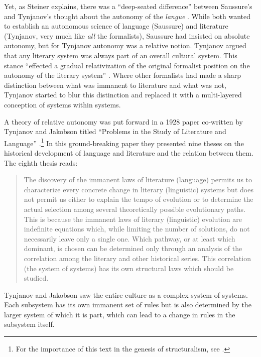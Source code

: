 \documentclass[output=paper]{langscibook}
\begin{document}
Yet, as Steiner explains, there was a ``deep-seated difference'' between Saussure's and Tynjanov's thought about the autonomy of the \emph{langue} \citep[112]{Steiner1984}. While both wanted to establish an autonomous science of language (Saussure) and literature (Tynjanov, very much like \emph{all} the formalists), Saussure had insisted on absolute autonomy, but for Tynjanov autonomy was a relative notion. Tynjanov argued that any literary system was always part of an overall cultural system. This stance ``effected a gradual relativization of the original formalist position on the autonomy of the literary system'' \citep[111]{Steiner1984}. Where other formalists had made a sharp distinction between what was immanent to literature and what was not, Tynjanov started to blur this distinction and replaced it with a multi-layered conception of systems within systems.

A theory of relative autonomy was put forward in a 1928 paper co-written by Tynjanov and Jakobson titled ``Problems in the Study of Literature and Language'' \citep{Tyjanov1928}.\footnote{For the importance of this text in the genesis of structuralism, see \citet[17]{Holenstein1975}.} In this ground-breaking paper they presented nine theses on the historical development of language and literature and the relation between them. The eighth thesis reads:

\begin{quotation}
The discovery of the immanent laws of literature (language) permits us to characterize every concrete change in literary (linguistic) systems but does not permit us either to explain the tempo of evolution or to determine the actual selection among several theoretically possible evolutionary paths. This is because the immanent laws of literary (linguistic) evolution are indefinite equations which, while limiting the number of solutions, do not necessarily leave only a single one. Which pathway, or at least which dominant, is chosen can be determined only through an analysis of the correlation among the literary and other historical series. This correlation (the system of systems) has its own structural laws which should be studied. \citep[Quotation given in English in][128]{Steiner1984}
\end{quotation}

Tynjanov and Jakobson saw the entire culture as a complex system of systems. Each subsystem has its own immanent set of rules but is also determined by the larger system of which it is part, which can lead to a change in rules in the subsystem itself.
\end{document}
